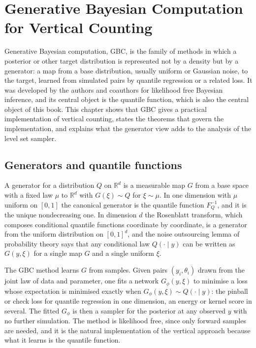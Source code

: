 \chapter{Generative Bayesian Computation for Vertical Counting}
\label{ch:gbc}

Generative Bayesian computation, GBC, is the family of methods in which a posterior or other target distribution is represented not by a density but by a generator: a map from a base distribution, usually uniform or Gaussian noise, to the target, learned from simulated pairs by quantile regression or a related loss. It was developed by the authors and coauthors \cite{PolsonSokolovGBC} for likelihood free Bayesian inference, and its central object is the quantile function, which is also the central object of this book. This chapter shows that GBC gives a practical implementation of vertical counting, states the theorems that govern the implementation, and explains what the generator view adds to the analysis of the level set sampler.

\section{Generators and quantile functions}

A generator for a distribution $Q$ on $\mathbb{R}^d$ is a measurable map $G$ from a base space with a fixed law $\mu$ to $\mathbb{R}^d$ with $G(\xi) \sim Q$ for $\xi \sim \mu$. In one dimension with $\mu$ uniform on $[0, 1]$ the canonical generator is the quantile function $F_Q^{-1}$, and it is the unique nondecreasing one. In dimension $d$ the Rosenblatt transform, which composes conditional quantile functions coordinate by coordinate, is a generator from the uniform distribution on $[0, 1]^d$, and the noise outsourcing lemma of probability theory says that any conditional law $Q(\cdot \mid y)$ can be written as $G(y, \xi)$ for a single map $G$ and a single uniform $\xi$.

The GBC method learns $G$ from samples. Given pairs $(y_i, \theta_i)$ drawn from the joint law of data and parameter, one fits a network $G_\phi(y, \xi)$ to minimise a loss whose expectation is minimised exactly when $G_\phi(y, \xi) \sim Q(\cdot \mid y)$: the pinball or check loss for quantile regression in one dimension, an energy or kernel score in several. The fitted $G_\phi$ is then a sampler for the posterior at any observed $y$ with no further simulation. The method is likelihood free, since only forward samples are needed, and it is the natural implementation of the vertical approach because what it learns is the quantile function.


